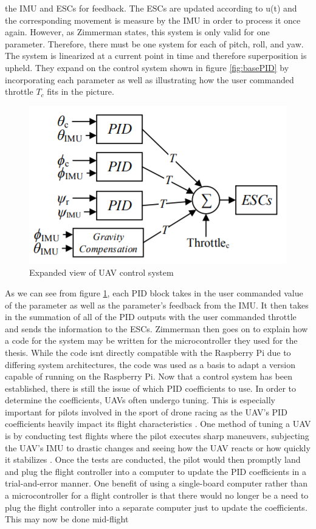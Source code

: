 \documentclass[english]{upeeei}
\begin{document}
the IMU and ESCs for feedback. The ESCs are updated according to u(t) and the corresponding movement is measure by the IMU in order to process it
once again. However, as Zimmerman states, this system is only valid for one parameter. Therefore, there must be one system for each of pitch, roll, 
and yaw. The system is linearized at a current point in time and therefore superposition is upheld. They expand on the control system shown in 
figure \ref{fig:basePID} by incorporating each parameter as well as illustrating how the user commanded throttle $T_c$ fits in the picture. 
\begin{figure}[h]
    \centering
    \includegraphics[scale=0.65]{images/controlSysExpanded.PNG}
    \caption{Expanded view of UAV control system \cite{zimmerman2016}}
    \label{fig:expandedPID}
\end{figure}
As we can see from figure \ref{fig:expandedPID}, each PID block takes in the user commanded value of the parameter as well as the parameter's
feedback from the IMU. It then takes in the summation of all of the PID outputs with the user commanded throttle and sends the information to the
ESCs. Zimmerman then goes on to explain how a code for the system may be written for the microcontroller they used for the thesis. While the code
isnt directly compatible with the Raspberry Pi due to differing system architectures, the code was used as a basis to adapt a version capable
of running on the Raspberry Pi.
\newline
\newline
Now that a control system has been established, there is still the issue of which PID coefficients to use. In order to determine the coefficients,
UAVs often undergo tuning. This is especially important for pilots involved in the sport of drone racing as the UAV's PID coefficients heavily
impact its flight characteristics \cite{Dowling2018}. One method of tuning a UAV is by conducting test flights where the pilot executes sharp
maneuvers, subjecting the UAV's IMU to drastic changes and seeing how the UAV reacts or how quickly it stabilizes \cite{Tuning2017}. Once the tests
are conducted, the pilot would then promptly land and plug the flight controller into a computer to update the PID coefficients in a trial-and-error
manner. One benefit of using a single-board computer rather than a microcontroller for a flight controller is that there would no longer be a need
to plug the flight controller into a separate computer just to update the coefficients. This may now be done mid-flight
\end{document}
